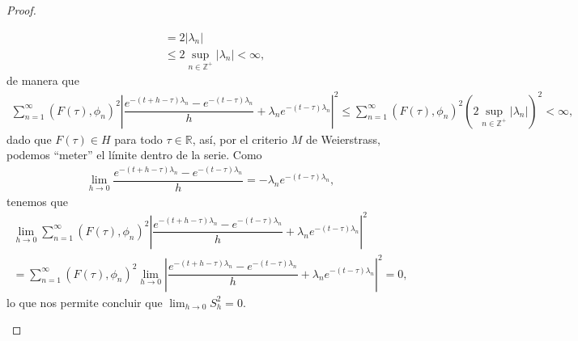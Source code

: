 \begin{proof}
\begin{enumerate}
\begin{align*}
        &=2|\lambda_n|\\
        &\leq 2\sup_{n \in \mathbb{Z}^+}|\lambda_n|<\infty,
    \end{align*}
    de manera que 
    \begin{align*}
        \sum_{n=1}^\infty (F(\tau),\phi_n)^2\left|\dfrac{e^{-(t+h-\tau)\lambda_n}-e^{-(t-\tau)\lambda_n}}{h}+\lambda_ne^{-(t-\tau)\lambda_n}\right|^2\leq \sum_{n=1}^\infty (F(\tau),\phi_n)^2\left(2\sup_{n \in \mathbb{Z}^+}|\lambda_n|\right)^2<\infty,
    \end{align*}
    dado que $F(\tau)\in H$ para todo $\tau \in \mathbb{R}$, así, por el criterio $M$ de Weierstrass, podemos ``meter'' el límite dentro de la serie. Como
    \begin{align*}
        \lim_{h\to 0}\dfrac{e^{-(t+h-\tau)\lambda_n}-e^{-(t-\tau)\lambda_n}}{h}=-\lambda_ne^{-(t-\tau)\lambda_n},
    \end{align*}
    tenemos que 
    \begin{align*}
        \lim_{h\to 0}\sum_{n=1}^\infty (F(\tau),\phi_n)^2\left|\dfrac{e^{-(t+h-\tau)\lambda_n}-e^{-(t-\tau)\lambda_n}}{h}+\lambda_ne^{-(t-\tau)\lambda_n}\right|^2\\
        =\sum_{n=1}^\infty (F(\tau),\phi_n)^2\lim_{h\to 0}\left|\dfrac{e^{-(t+h-\tau)\lambda_n}-e^{-(t-\tau)\lambda_n}}{h}+\lambda_ne^{-(t-\tau)\lambda_n}\right|^2=0,
    \end{align*}
    lo que nos permite concluir que $\displaystyle \lim_{h\to 0}S_h^2=0$. 


\end{enumerate}
\end{proof}
